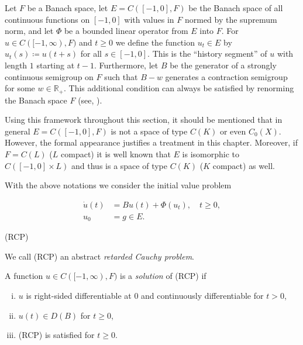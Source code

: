 Let $F$ be a Banach space, let $E = C([-1,0],F)$ be the Banach space of all continuous functions on $[-1,0]$ with values in $F$ normed by the supremum norm, and let $\Phi$ be a bounded linear operator from $E$ into $F$.
For $u \in C([-1,\infty),F)$ and $t \geq 0$ we define the function $u_{t} \in E$ by $u_{t}(s) \coloneq  u(t+s)$ for all $s \in [-1,0]$.
This is the \enquote{history segment} of $u$ with length $1$ starting at $t-1$.
Furthermore, let $B$ be the generator of a strongly continuous semigroup on $F$ such that $B - w$ generates a contraction semigroup for some $w \in \mathbb{R}_{+}$.
This additional condition can always be satisfied by renorming the Banach space $F$ (see, ).

Using this framework throughout this section, it should be mentioned that in general $E = C([-1,0],F)$ is not a space of type $C(K)$ or even $C_{0}(X)$.
However, the formal appearance justifies a treatment in this chapter.
Moreover, if $F = C(L)$ ($L$ compact) it is well known that $E$ is isomorphic to $C([-1,0] \times L)$ and thus is a space of type $C(K)$ ($K$ compact) as well.

With the above notations we consider the initial value problem
\\
\begin{minipage}{0.9\textwidth}
\begin{equation*}
	\begin{aligned}
		\dot{u}(t) &= Bu(t) + \Phi(u_{t}), \quad t \geq 0, \\
		u_{0} &= g \in E.
	\end{aligned}
\end{equation*}
\end{minipage}
\hfill
\begin{minipage}{0.05\textwidth}
(RCP)
\end{minipage}
%
\newpage

We call (RCP) an abstract \emph{retarded Cauchy problem}.

A function $u \in C([-1,\infty),F)$ is a \emph{solution} of (RCP) if
\begin{enumerate}[(i)]
	\item 
	$u$ is right-sided differentiable at 0 and continuously differentiable for $t  >  0$,
	
	\item 
	$u(t) \in D(B)$ for $t \geq 0$,
	\item 
	(RCP) is satisfied for $t \geq 0$.
\end{enumerate}

